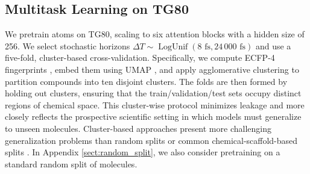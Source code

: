 
\subsection{Multitask Learning on TG80}
\label{sec:multitask_learning}

We pretrain \gls{atoms} on TG80, scaling to six attention blocks with a hidden size of 256. We select stochastic horizons \(\Delta T \sim \operatorname{LogUnif}(8 \text{ fs}, 24\,000 \text{ fs})\) and use a five-fold, cluster-based cross-validation. Specifically, we compute ECFP-4 fingerprints \cite{rogers_extended-connectivity_2010}, embed them using UMAP \cite{mcinnes_umap_2018}, and apply agglomerative clustering \cite{ward_hierarchical_1963} to partition compounds into ten disjoint clusters. The folds are then formed by holding out clusters, ensuring that the train/validation/test sets occupy distinct regions of chemical space. This cluster-wise protocol minimizes leakage and more closely reflects the prospective scientific setting in which models must generalize to unseen molecules. Cluster-based approaches present more challenging generalization problems than random splits or common chemical-scaffold-based splits \cite{guo_scaffold_2024}. In Appendix \ref{sect:random_split}, we also consider pretraining on a standard random split of molecules. 


